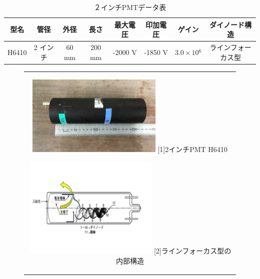 \begin{table}[htb]
	\centering
	 \begin{tabular}{cccccccc}\hline
	型名& 管径 & 外径 & 長さ & 最大電圧 & 印加電圧 & ゲイン & ダイノード構造 \\ \hline \hline
	H6410 & 2 インチ & 60 mm & 200 mm & -2000 V & -1850 V & $3.0\times10{^{6}}$ &ラインフォーカス型 \\ \hline
	\end{tabular}
	  \caption{２インチPMTデータ表}
\end{table}

\begin{figure}[h]
  \begin{center}
    \begin{tabular}{c}
      \begin{minipage}[t]{0.5\hsize}    
        \begin{center}
          \includegraphics[width=6.5cm]{fig/iguchi/PMTphoto.jpg}
	\hspace{1cm}[1]2インチPMT H6410
     \end{center}
    \end{minipage}
      \begin{minipage}[t]{0.5\hsize}    
        \begin{center}
          \includegraphics[width=6.5cm]{fig/iguchi/PMTinner.pdf}
         \hspace{2cm}[2]ラインフォーカス型の内部構造
         \end{center}
        \end{minipage}
     
     \end{tabular}
     \label{PMT12}
    \end{center}
 \end{figure}

